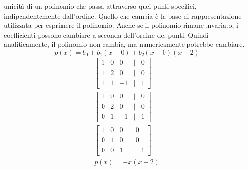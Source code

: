 \documentclass{article}
\begin{document}
\begin{example}
    unicità di un polinomio che passa attraverso quei punti specifici,
    indipendentemente dall'ordine. Quello che cambia è la base di
    rappresentazione utilizzata per esprimere il polinomio. Anche se il
    polinomio rimane invariato, i coefficienti possono cambiare a seconda
    dell'ordine dei punti. Quindi analiticamente, il polinomio non cambia, ma
    numericamente potrebbe cambiare.
    $$p(x)=b_0+b_1(x-0)+b_2(x-0)(x-2)$$
    \begin{equation*}
       \begin{aligned}
           \begin{bmatrix}
               1 & 0 & 0 & | & 0\\
               1 & 2 & 0 & | & 0\\
               1 & 1 & -1 & | & 1
           \end{bmatrix}\\
           \begin{bmatrix}
               1 & 0 & 0 & | & 0\\
               0 & 2 & 0 & | & 0\\
               0 & 1 & -1 & | & 1
           \end{bmatrix}\\
           \begin{bmatrix}
               1 & 0 & 0 & | & 0\\
               0 & 1 & 0 & | & 0\\
               0 & 0 & 1 & | & -1
           \end{bmatrix}\\
           p(x)=-x(x-2)
       \end{aligned} 
    \end{equation*}
\end{example}
\end{document}

